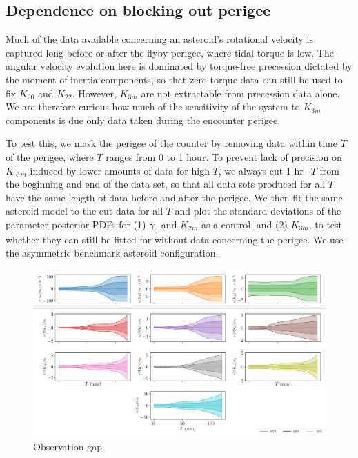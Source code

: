 \documentclass{aastex631}
\begin{document}
\subsection{Dependence on blocking out perigee}
\label{sec:block-perigee}
Much of the data available concerning an asteroid's rotational velocity is captured long before or after the flyby perigee, where tidal torque is low. The angular velocity evolution here is dominated by torque-free precession dictated by the moment of inertia components, so that zero-torque data can still be used to fix $K_{20}$ and $K_{22}$. However, $K_{3m}$ are not extractable from precession data alone. We are therefore curious how much of the sensitivity of the system to $K_{3m}$ components is due only data taken during the encounter perigee.

To test this, we mask the perigee of the counter by removing data within time $T$ of the perigee, where $T$ ranges from 0 to 1 hour. To prevent lack of precision on $K_{\ell m}$ induced by lower amounts of data for high $T$, we always cut 1 hr$-T$ from the beginning and end of the data set, so that all data sets produced for all $T$ have the same length of data before and after the perigee. We then fit the same asteroid model to the cut data for all $T$ and plot the standard deviations of the parameter posterior PDFs for (1) $\gamma_0$ and $K_{2m}$ as a control, and (2) $K_{3m}$, to test whether they can still be fitted for without data concerning the perigee. We use the asymmetric benchmark asteroid configuration.

\begin{figure}
  \centering
  \includegraphics[width=\textwidth]{observation-gap.pdf}
  \caption{Observation gap}
  \label{fig:observation-gap}
\end{figure}
\end{document}
